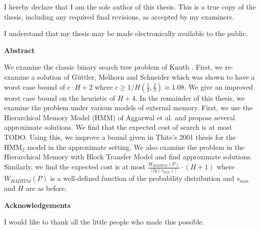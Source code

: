   \noindent
I hereby declare that I am the sole author of this thesis. This is a true copy of the thesis, including any required final revisions, as accepted by my examiners.

  \bigskip
  
  \noindent
I understand that my thesis may be made electronically available to the public.

\cleardoublepage


\begin{center}\textbf{Abstract}\end{center}

We examine the classic binary search tree problem of Knuth \cite{knuth1971optimum}. First, we re-examine a solution of G{\"u}ttler, Melhorn and Schneider \cite{guttler1980binary} which was shown to have a worst case bound of $c \cdot H + 2$ where $c \geq 1/H(\frac{1}{3},\frac{2}{3}) \approx 1.08$. We give an improved worst case bound on the heuristic of $H+4$. In the remainder of this thesis, we examine the problem under various models of external memory. First, we use the Hierarchical Memory Model (HMM) of Aggarwal et al. \cite{aggarwal1987model} and propose several approximate solutions. We find that the expected cost of search is at most TODO. Using this, we improve a bound given in Thite's 2001 thesis for the HMM$_2$ model in the approximate setting. We also examine the problem in the Hierarchical Memory with Block Transfer Model \cite{aggarwal1987hierarchical} and find approximate solutions. Similarly, we find the expected cost is at most $\frac{W_{HMBTM}(P)}{\lceil lg(s_{min}) \rceil} \cdot (H+1)$ where $W_{HMBTM}(P)$ is a well-defined function of the probability distribution and $s_{min}$ and $H$ are as before. 

\cleardoublepage


\begin{center}\textbf{Acknowledgements}\end{center}

I would like to thank all the little people who made this possible.
\cleardoublepage


